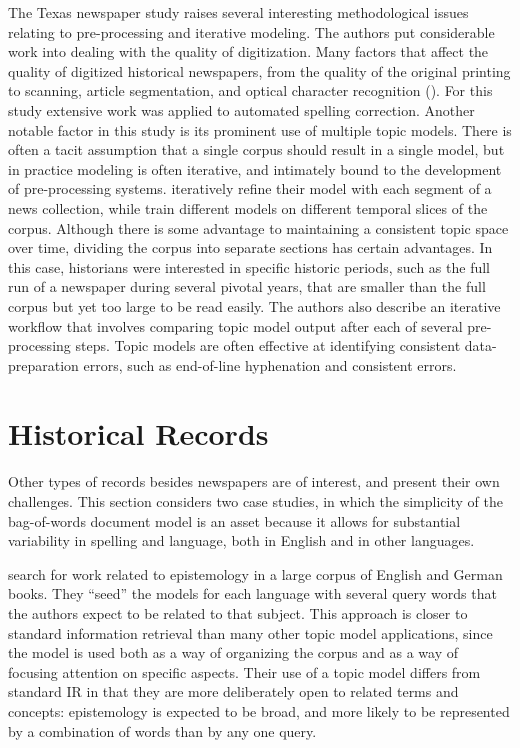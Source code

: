 The Texas newspaper study raises several interesting methodological issues relating to pre-processing and iterative modeling.
The authors put considerable work into dealing with the quality of digitization.
Many factors that affect the quality of digitized historical newspapers, from the quality of the original printing to scanning, article segmentation, and optical character recognition ().
For this study extensive work was applied to automated spelling correction.
Another notable factor in this study is its prominent use of multiple topic models.
There is often a tacit assumption that a single corpus should result in a single model, but in practice modeling is often iterative, and intimately bound to the development of pre-processing systems.
\citet{alsumait-08} iteratively refine their model with each segment of a news collection, while
\citet{yang-11-historical} train different models on different temporal slices of the corpus.
Although there is some advantage to maintaining a consistent topic space over time, dividing the corpus into separate sections has certain advantages.
In this case, historians were interested in specific historic periods, such as the full run of a newspaper during several pivotal years, that are smaller than the full corpus but yet too large to be read easily.
The authors also describe an iterative workflow that involves comparing topic model output after each of several pre-processing steps.
Topic models are often effective at identifying consistent data-preparation errors, such as end-of-line hyphenation and consistent  errors.

\section{Historical Records}

Other types of records besides newspapers are of interest, and present their own challenges.
This section considers two case studies, in which the simplicity of the bag-of-words document model is an asset because it allows for substantial variability in spelling and language, both in English and in other languages.

\citet{erlin2017topic} search for work related to epistemology in a large corpus of English and German books.
They ``seed'' the models for each language with several query words that the authors expect to be related to that subject.
This approach is closer to standard information retrieval than many other topic model applications, since the model is used both as a way of organizing the corpus and as a way of focusing attention on specific aspects.
Their use of a topic model differs from standard IR in that they are more deliberately open to related terms and concepts: epistemology is expected to be broad, and more likely to be represented by a combination of words than by any one query.

